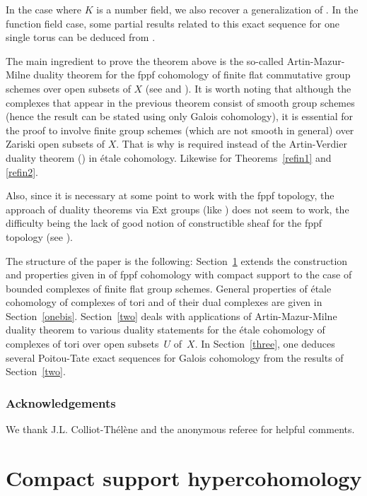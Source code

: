 \documentclass[11pt]{article}
\theoremstyle{plain}
\theoremstyle{definition}
\begin{document}
In the case where $K$ is a number field, we also recover a generalization of \cite[Th.\,6.1 \& 6.3]{demphd}. In the function field case, some partial results related to this exact sequence for one single torus can be deduced from \cite[\S6]{gonz1}.

The main ingredient to prove the theorem above is the so-called Artin-Mazur-Milne duality theorem for the fppf cohomology of finite flat commutative group schemes over open subsets of $X$ (see \cite[Th.\,III.8.2]{MilADT} and \cite[Th.\,1.1]{DemH}).
It is worth noting that although the complexes that appear in the previous
theorem consist of smooth group schemes (hence the result can be stated
using only Galois cohomology), it is essential for the proof to involve
finite group schemes (which are not
smooth in general) over Zariski open subsets of $X$. That is why
\cite[Th.\,1.1]{DemH} is required instead of the Artin-Verdier
duality theorem (\cite[Cor.\,II.3.3]{MilADT}) in étale cohomology.
Likewise for Theorems~\ref{refin1} and \ref{refin2}.\enlargethispage{-\baselineskip}%

Also, since it is necessary at some point to work with the fppf topology,
the approach of duality theorems via Ext groups (like \cite[Th.\,II.3.1]{MilADT}) does not seem to work, the difficulty being the lack of good
notion of constructible sheaf for the fppf topology (see \cite[Introduction to Chap.\,III]{MilADT}).

The structure of the paper is the following: Section~\ref{one} extends the construction and properties given in \cite{DemH} of fppf cohomology with compact support to the case of bounded complexes of finite flat group schemes. General properties of étale cohomology of complexes of tori and of their dual complexes are given in Section~\ref{onebis}. Section~\ref{two} deals with applications of Artin-Mazur-Milne duality theorem to various duality statements for the étale cohomology of complexes of tori over open subsets~$U$ of~$X$. In Section~\ref{three}, one deduces several Poitou-Tate exact sequences for Galois cohomology from the results of Section~\ref{two}.

\subsubsection*{Acknowledgements}
We thank J.L. Colliot-Thélène and the anonymous referee
for helpful comments.

\section{Compact support hypercohomology} \label{one}
\end{document}

